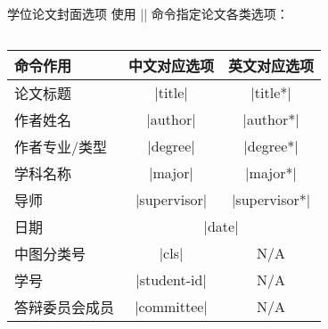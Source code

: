 \begin{frame}[fragile]{学位论文封面选项}
  使用 || 命令指定论文各类选项：
  \begin{columns}
    \begin{column}{.6\textwidth}
      \begin{table}[h]
      \centering
      \tiny
      \begin{tabular}{lcc}
        \toprule
        命令作用 & 中文对应选项 & 英文对应选项 \\
        \midrule
        论文标题 & |title| & |title*| \\
        作者姓名 & |author| &|author*| \\
        作者专业/类型 & |degree| &|degree*| \\
        学科名称 & |major| & |major*| \\
        导师 & |supervisor| & |supervisor*|\\
        日期 & \multicolumn{2}{c}{|date|}\\
        中图分类号 & |cls| & N/A \\
        学号 & |student-id| & N/A \\
        答辩委员会成员 & |committee| & N/A \\
        \bottomrule
      \end{tabular}
      \end{table}
    \end{column}
    \begin{column}{.35\textwidth}
      \begin{texcode}[gobble=8,keywords={hustsetup}]
      \end{texcode}
    \end{column}
  \end{columns}

\end{frame}
